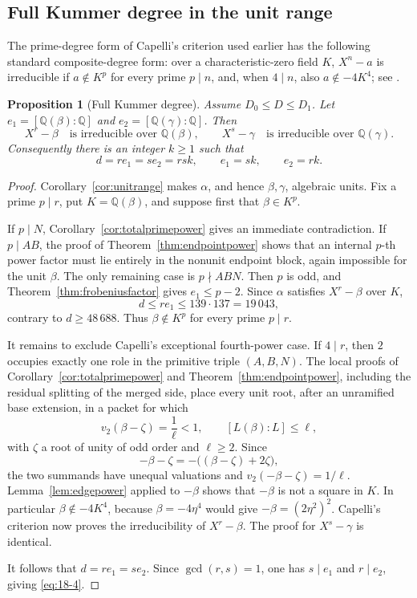 \documentclass[11pt]{article}
\numberwithin{equation}{section}
\newtheorem{proposition}[theorem]{Proposition}
\theoremstyle{definition}
\newcommand{\Q}{\mathbb Q}
\begin{document}
\subsection{Full Kummer degree in the unit range}

The prime-degree form of Capelli's criterion used earlier has the following
standard composite-degree form: over a characteristic-zero field \(K\),
\(X^n-a\) is irreducible if \(a\notin K^p\) for every prime \(p\mid n\),
and, when \(4\mid n\), also \(a\notin-4K^4\); see
\cite[Chapter~VI, Section~9]{LangAlgebra}.

\begin{proposition}[Full Kummer degree]
\label{prop:unitkummer}
Assume \(D_0\leq D\leq D_1\).  Let \(e_1=[\Q(\beta):\Q]\) and
\(e_2=[\Q(\gamma):\Q]\).  Then
\[
 X^r-\beta\quad\text{is irreducible over }\Q(\beta),
 \qquad
 X^s-\gamma\quad\text{is irreducible over }\Q(\gamma).
\]
Consequently there is an integer \(k\geq1\) such that
\begin{equation}
 d=re_1=se_2=rsk,
 \qquad e_1=sk,
 \qquad e_2=rk.
 \label{eq:18-4}
\end{equation}
\end{proposition}

\begin{proof}
Corollary~\ref{cor:unitrange} makes \(\alpha\), and hence \(\beta,\gamma\),
algebraic units.  Fix a prime \(p\mid r\), put \(K=\Q(\beta)\), and suppose
first that \(\beta\in K^p\).

If \(p\mid N\), Corollary~\ref{cor:totalprimepower} gives an immediate
contradiction.  If \(p\mid AB\), the proof of
Theorem~\ref{thm:endpointpower} shows that an internal \(p\)-th power factor
must lie entirely in the nonunit endpoint block, again impossible for the
unit \(\beta\).  The only remaining case is \(p\nmid ABN\).  Then \(p\) is
odd, and Theorem~\ref{thm:frobeniusfactor} gives \(e_1\leq p-2\).  Since
\(\alpha\) satisfies \(X^r-\beta\) over \(K\),
\[
 d\leq re_1\leq139\cdot137=19\,043,
\]
contrary to \(d\geq48\,688\).  Thus \(\beta\notin K^p\) for every
prime \(p\mid r\).

It remains to exclude Capelli's exceptional fourth-power case.  If
\(4\mid r\), then \(2\) occupies exactly one role in the primitive triple
\((A,B,N)\).  The local proofs of Corollary~\ref{cor:totalprimepower} and
Theorem~\ref{thm:endpointpower}, including the residual splitting of the
merged side, place every unit root, after an unramified base extension, in a
packet for which
\[
 v_2(\beta-\zeta)=\frac1\ell<1,
 \qquad [L(\beta):L]\leq\ell,
\]
with \(\zeta\) a root of unity of odd order and \(\ell\geq2\).  Since
\[
 -\beta-\zeta=-\bigl((\beta-\zeta)+2\zeta\bigr),
\]
the two summands have unequal valuations and
\(v_2(-\beta-\zeta)=1/\ell\).  Lemma~\ref{lem:edgepower} applied to
\(-\beta\) shows that \(-\beta\) is not a square in \(K\).  In particular
\(\beta\notin-4K^4\), because
\(\beta=-4\eta^4\) would give \(-\beta=(2\eta^2)^2\).
Capelli's criterion now proves the irreducibility of \(X^r-\beta\).
The proof for \(X^s-\gamma\) is identical.

It follows that \(d=re_1=se_2\).  Since \(\gcd(r,s)=1\), one has
\(s\mid e_1\) and \(r\mid e_2\), giving \eqref{eq:18-4}.
\end{proof}
\end{document}
